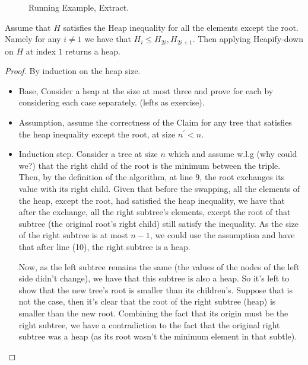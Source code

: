\begin{figure}[h]
  \centering
  \begin{subfigure}[b]{0.23\textwidth}
	
  \end{subfigure}
\begin{subfigure}[b]{0.23\textwidth}
	
  \end{subfigure}
\begin{subfigure}[b]{0.23\textwidth}
	
  \end{subfigure}
\begin{subfigure}[b]{0.23\textwidth}
	
  \end{subfigure}
  \caption{Running Example, Extract.} 
\end{figure}


\begin{claim}
  
Assume that $H$ satisfies the Heap inequality for all the elements except the root. Namely for any $i \neq 1$ we have that $H_{i} \le H_{2i}, H_{2i+1}$. Then applying Heapify-down on $H$ at index $1$ returns a heap.  
\end{claim}

\begin{proof}
  
By induction on the heap size.  
 
\begin{itemize} 
  \item Base, Consider a heap at the size at most three and prove for each by considering each case separately. (lefts as exercise).  
  \item Assumption, assume the correctness of the Claim for any tree that satisfies the heap inequality except the root, at size $n^{\prime} < n$. 
  \item Induction step. Consider a tree at size $n$ which and assume w.l.g (why could we?) that the right child of the root is the minimum between the triple. Then, by the definition of the algorithm, at line 9, the root exchanges its value with its right child. Given that before the swapping, all the elements of the heap, except the root, had satisfied the heap inequality, we have that after the exchange, all the right subtree's elements, except the root of that subtree (the original root's right child) still satisfy the inequality. As the size of the right subtree is at most $n-1$, we could use the assumption and have that after line (10), the right subtree is a heap.  

    Now, as the left subtree remains the same (the values of the nodes of the left side didn't change), we have that this subtree is also a heap. So it's left to show that the new tree's root is smaller than its children's. Suppose that is not the case, then it's clear that the root of the right subtree (heap) is smaller than the new root. Combining the fact that its origin must be the right subtree, we have a contradiction to the fact that the original right subtree was a heap (as its root wasn't the minimum element in that subtle).  
 
\end{itemize} 
 \end{proof}

